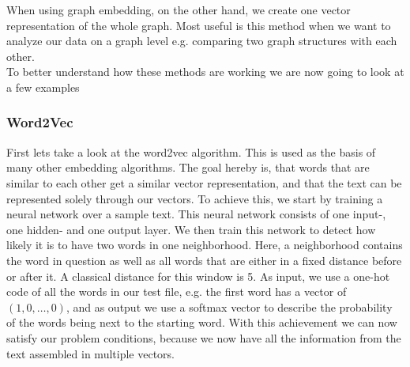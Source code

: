 \documentclass[sigconf]{acmart}
\begin{document}
When using graph embedding, on the other hand, we create one vector representation of the whole graph. Most useful is this method when we want to analyze our data on a graph level e.g.
comparing two graph structures with each other.\\
To better understand how these methods are working we are now going to look at a few examples
\subsubsection{Word2Vec}
First lets take a look at the word2vec algorithm. This is used as the basis of many other embedding algorithms.
The goal hereby is, that words that are similar to each other get a similar vector representation, and that the text can be represented solely through our vectors.
To achieve this, we start by training a neural network over a sample text. This neural network consists of one input-, one hidden- and one output layer. 
We then train this network to detect how likely it is to have two words in one neighborhood. Here, a neighborhood contains the word in question as well as
all words that are either in a fixed distance before or after it. A classical distance for this window is 5.
As input, we use a one-hot code of all the words in our test file, e.g. the first word has a vector of \((1, 0,\ldots ,0)\), and as output we use a softmax vector to 
describe the probability of the words being next to the starting word. With this achievement we can now satisfy our problem conditions, because we now have all the information 
from the text assembled in multiple vectors.
\end{document}
